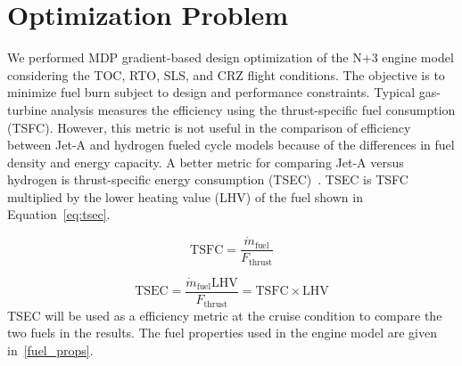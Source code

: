 \documentclass[conf]{new-aiaa}
\begin{document}
\section{Optimization Problem}
\label{sec:optprob}
We performed MDP gradient-based design optimization of the N+3 engine model considering the TOC, RTO, SLS, and CRZ flight conditions.
The objective is to minimize fuel burn subject to design and performance constraints.
Typical gas-turbine analysis measures the efficiency using the thrust-specific fuel consumption (TSFC).
However, this metric is not useful in the comparison of efficiency between Jet-A and hydrogen fueled cycle models because of the differences in fuel density and energy capacity.
A better metric for comparing Jet-A versus hydrogen is thrust-specific energy consumption (TSEC)~\cite{Adler2023}.
TSEC is TSFC multiplied by the lower heating value (LHV) of the fuel shown in Equation~\eqref{eq:tsec}.

\begin{equation}
    \mathrm{TSFC} = \frac{\dot{m}_{\mathrm{fuel}}}{F_{\mathrm{thrust}}}
    \label{eq:tsfc}
\end{equation}

\begin{equation}
    \mathrm{TSEC} = \frac{\dot{m}_{\mathrm{fuel}} \mathrm{LHV}}{F_{\mathrm{thrust}}} = \mathrm{TSFC} \times \mathrm{LHV}
    \label{eq:tsec}
\end{equation}
TSEC will be used as a efficiency metric at the cruise condition to compare the two fuels in the results.
The fuel properties used in the engine model are given in~\ref{fuel_props}.
\end{document}
